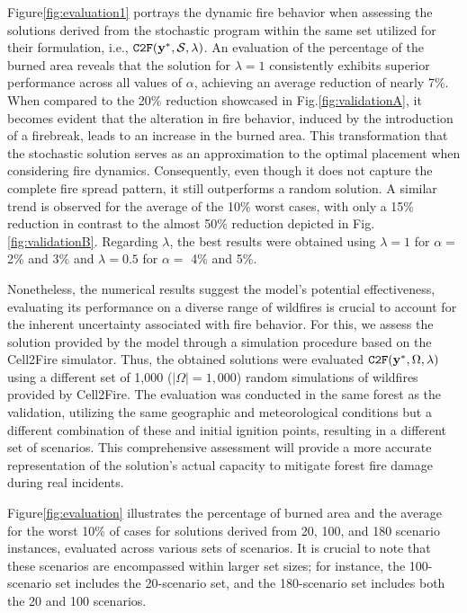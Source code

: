 \documentclass[a4paper,fleqn]{cas-sc}
\begin{document}
Figure\:\ref{fig:evaluation1} portrays the dynamic fire behavior when assessing the solutions derived from the stochastic program within the same set utilized for their formulation, i.e., $\texttt{C2F}(\vb{y}^*, \mathcal{S}, \lambda)$. An evaluation of the percentage of the burned area reveals that the solution for $\lambda = 1$ consistently exhibits superior performance across all values of $\alpha$, achieving an average reduction of nearly 7\%. When compared to the 20\% reduction showcased in Fig.\:\ref{fig:validationA}, it becomes evident that the alteration in fire behavior, induced by the introduction of a firebreak, leads to an increase in the burned area. This transformation that the stochastic solution serves as an approximation to the optimal placement when considering fire dynamics. Consequently, even though it does not capture the complete fire spread pattern, it still outperforms a random solution. A similar trend is observed for the average of the 10\% worst cases, with only a 15\% reduction in contrast to the almost 50\% reduction depicted in Fig.\:\ref{fig:validationB}. Regarding $\lambda$, the best results were obtained using $\lambda = 1$ for $\alpha = $2\% and 3\% and $\lambda = 0.5$ for $\alpha =$ 4\% and 5\%.

Nonetheless, the numerical results suggest the model's potential effectiveness, evaluating its performance on a diverse range of wildfires is crucial to account for the inherent uncertainty associated with fire behavior. For this, we assess the solution provided by the model through a simulation procedure based on the Cell2Fire simulator. Thus, the obtained solutions were evaluated $\texttt{C2F}(\vb{y}^*, \Omega, \lambda)$ using a different set of 1,000 ($\vert \Omega \rvert = 1,000$) random simulations of wildfires provided by Cell2Fire. The evaluation was conducted in the same forest as the validation, utilizing the same geographic and meteorological conditions but a different combination of these and initial ignition points, resulting in a different set of scenarios. This comprehensive assessment will provide a more accurate representation of the solution's actual capacity to mitigate forest fire damage during real incidents.

Figure\:\ref{fig:evaluation} illustrates the percentage of burned area and the average for the worst 10\% of cases for solutions derived from 20, 100, and 180 scenario instances, evaluated across various sets of scenarios. It is crucial to note that these scenarios are encompassed within larger set sizes; for instance, the 100-scenario set includes the 20-scenario set, and the 180-scenario set includes both the 20 and 100 scenarios.
\end{document}

